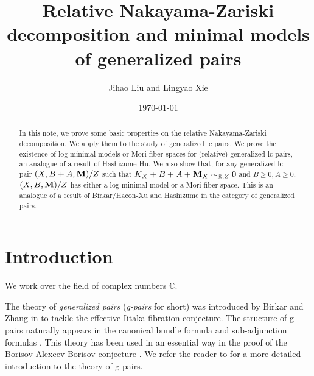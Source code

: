 \documentclass[11pt]{amsart}
\numberwithin{equation}{section}
\newcommand{\Mm}{{\bf{M}}}
\newcommand{\Rr}{\mathbb{R}}
\theoremstyle{definition}
\theoremstyle{definition}
\theoremstyle{definition}
\begin{document}
\title{Relative Nakayama-Zariski decomposition and minimal models of generalized pairs}
\author{Jihao Liu and Lingyao Xie}


\address{Department of Mathematics, Northwestern University, 2033 Sheridan Rd, Evanston, IL 60208, USA}


\address{Department of Mathematics, The University of Utah, Salt Lake City, UT 84112, USA}


\date{\today}



\begin{abstract}
In this note, we prove some basic properties on the relative Nakayama-Zariski decomposition. We apply them to the study of generalized lc pairs. We prove the existence of log minimal models or Mori fiber spaces for (relative) generalized lc pairs, an analogue of a result of Hashizume-Hu. We also show that, for any generalized lc pair $(X,B+A,\Mm)/Z$ such that $K_X+B+A+\Mm_X\sim_{\Rr,Z}0$ and $B\geq 0,A\geq 0$, $(X,B,\Mm)/Z$ has either a log minimal model or a Mori fiber space. This is an analogue of a result of Birkar/Hacon-Xu and Hashizume in the category of generalized pairs.
\end{abstract}

\maketitle

\tableofcontents
\section{Introduction}

We work over the field of complex numbers $\mathbb C$.

The theory of \emph{generalized pairs} (\emph{g-pairs} for short) was introduced by Birkar and Zhang in \cite{BZ16} to tackle the effective Iitaka fibration conjecture. The structure of g-pairs naturally appears in the canonical bundle formula and sub-adjunction formulas \cite{Kaw98,FM00}. This theory has been used in an essential way in the proof of the Borisov-Alexeev-Borisov conjecture \cite{Bir19,Bir21}. We refer the reader to \cite{Bir20} for a more detailed introduction to the theory of g-pairs.
\end{document}
